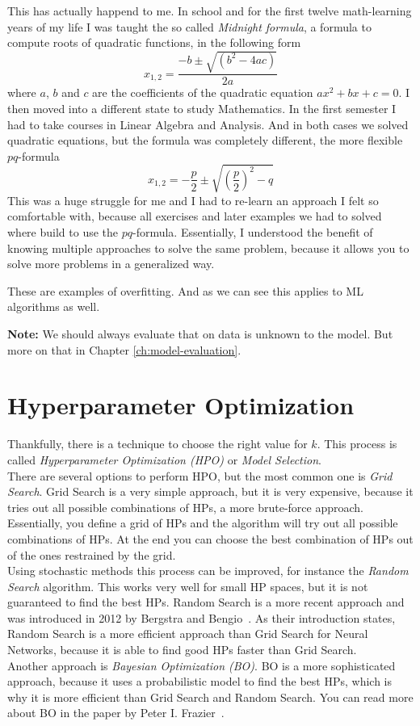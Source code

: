 This has actually happend to me. In school and for the first twelve math-learning years of my life I was taught the so called \textit{Midnight formula}, a formula to compute roots of quadratic functions, in the following form
\begin{equation*}
  x_{1,2} = \frac{-b\pm\sqrt{\left(b^2-4ac\right)}}{2a} 
\end{equation*}
where $a$, $b$ and $c$ are the coefficients of the quadratic equation $ax^2+bx+c=0$.
I then moved into a different state to study Mathematics.
In the first semester I had to take courses in Linear Algebra and Analysis.
And in both cases we solved quadratic equations, but the formula was completely different, the more flexible $pq$-formula
\begin{equation*}
  x_{1,2} = -\frac{p}{2}\pm\sqrt{\left(\frac{p}{2}\right)^2-q}
\end{equation*}
This was a huge struggle for me and I had to re-learn an approach I felt so comfortable with, because all exercises and later examples we had to solved where build to use the $pq$-formula.
Essentially, I understood the benefit of knowing multiple approaches to solve the same problem, because it allows you to solve more problems in a generalized way.

These are examples of overfitting. And as we can see this applies to ML algorithms as well.

\textbf{Note:} We should always evaluate that on data is unknown to the model. But more on that in Chapter \ref{ch:model-evaluation}.
\section{Hyperparameter Optimization}
\label{sec:hpo}
Thankfully, there is a technique to choose the right value for $k$. This process is called \textit{Hyperparameter Optimization (HPO)} or \textit{Model Selection}.\\
There are several options to perform HPO, but the most common one is \textit{Grid Search}.
Grid Search is a very simple approach, but it is very expensive, because it tries out all possible combinations of HPs, a more brute-force approach.
Essentially, you define a grid of HPs and the algorithm will try out all possible combinations of HPs.
At the end you can choose the best combination of HPs out of the ones restrained by the grid.\\
Using stochastic methods this process can be improved, for instance the \textit{Random Search} algorithm.
This works very well for small HP spaces, but it is not guaranteed to find the best HPs.
Random Search is a more recent approach and was introduced in 2012 by Bergstra and Bengio~\cite{bergstra2012random}.
As their introduction states, Random Search is a more efficient approach than Grid Search for Neural Networks, because it is able to find good HPs faster than Grid Search.\\
Another approach is \textit{Bayesian Optimization (BO)}.
BO is a more sophisticated approach, because it uses a probabilistic model to find the best HPs, which is why it is more efficient than Grid Search and Random Search.
You can read more about BO in the paper by Peter I. Frazier~\cite{frazier2018tutorial}.

